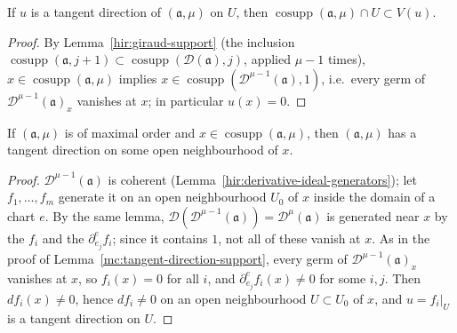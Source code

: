 \begin{lemma}
\label{mc:tangent-direction-support}
\leanok
If \(u\) is a tangent direction of \((\mathfrak a,\mu)\) on \(U\), then \(\operatorname{cosupp}(\mathfrak a,\mu)\cap U\subset V(u)\).
\end{lemma}
\begin{proof}
\leanok
By Lemma~\ref{hir:giraud-support} (the inclusion \(\operatorname{cosupp}(\mathfrak a,j+1)\subset\operatorname{cosupp}(\mathcal D(\mathfrak a),j)\), applied
\(\mu-1\) times), \(x\in\operatorname{cosupp}(\mathfrak a,\mu)\) implies \(x\in\operatorname{cosupp}(\mathcal D^{\mu-1}(\mathfrak a),1)\), i.e.\ every germ of
\(\mathcal D^{\mu-1}(\mathfrak a)_x\) vanishes at \(x\); in particular \(u(x)=0\).
\end{proof}

\begin{lemma}
\label{mc:tangent-direction-exists}
\leanok
If \((\mathfrak a,\mu)\) is of maximal order and \(x\in\operatorname{cosupp}(\mathfrak a,\mu)\), then \((\mathfrak a,\mu)\) has a tangent direction on
some open neighbourhood of \(x\).
\end{lemma}
\begin{proof}
\leanok
\(\mathcal D^{\mu-1}(\mathfrak a)\) is coherent (Lemma~\ref{hir:derivative-ideal-generators}); let \(f_1,\dots,f_m\) generate it on an open
neighbourhood \(U_0\) of \(x\) inside the domain of a chart \(e\). By the same lemma, \(\mathcal D(\mathcal D^{\mu-1}(\mathfrak a))=\mathcal D^\mu(\mathfrak a)\) is
generated near \(x\) by the \(f_i\) and the \(\partial^e_{e_j}f_i\); since it contains \(1\), not all of these vanish at \(x\). As in the proof
of Lemma~\ref{mc:tangent-direction-support}, every germ of \(\mathcal D^{\mu-1}(\mathfrak a)_x\) vanishes at \(x\), so \(f_i(x)=0\) for all \(i\), and
\(\partial^e_{e_j}f_i(x)\ne0\) for some \(i,j\). Then \(df_i(x)\ne0\), hence \(df_i\ne0\) on an open neighbourhood \(U\subset U_0\) of \(x\), and
\(u=f_i|_U\) is a tangent direction on \(U\).
\end{proof}

